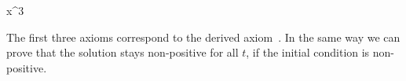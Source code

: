 \begin{example}
\begin{sequentdeduction}
{{{{                                \land
                            }
                        }{
                            \limply
                            x^3
                            \land
                            \land
                        }
                    }{
                        \limply
                        \land
                    }    
                }{
                    \limply
                }
            \end{sequentdeduction}
            \normalsize
            The first three axioms correspond to the derived axiom~.
            In the same way we can prove that the solution stays non-positive for all $t$, if the initial condition is non-positive.
        \end{example}


